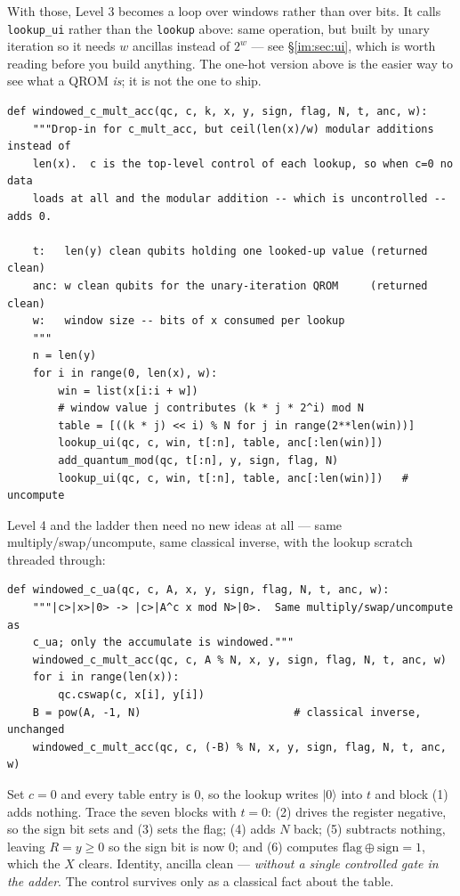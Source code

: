 \documentclass[11pt]{article}
\renewcommand{\ket}[1]{\lvert #1 \rangle}
\newcommand{\code}[1]{\texttt{#1}}
\theoremstyle{plain}
\theoremstyle{remark}
\begin{document}
\noindent
With those, Level 3 becomes a loop over windows rather than over bits. It calls \code{lookup\_ui} rather than the \code{lookup} above: same operation, but built by unary iteration so it needs $w$ ancillas instead of $2^w$ --- see \S\ref{im:sec:ui}, which is worth reading before you build anything. The one-hot version above is the easier way to see what a QROM \emph{is}; it is not the one to ship.

\begin{lstlisting}
def windowed_c_mult_acc(qc, c, k, x, y, sign, flag, N, t, anc, w):
    """Drop-in for c_mult_acc, but ceil(len(x)/w) modular additions instead of
    len(x).  c is the top-level control of each lookup, so when c=0 no data
    loads at all and the modular addition -- which is uncontrolled -- adds 0.

    t:   len(y) clean qubits holding one looked-up value (returned clean)
    anc: w clean qubits for the unary-iteration QROM     (returned clean)
    w:   window size -- bits of x consumed per lookup
    """
    n = len(y)
    for i in range(0, len(x), w):
        win = list(x[i:i + w])
        # window value j contributes (k * j * 2^i) mod N
        table = [((k * j) << i) % N for j in range(2**len(win))]
        lookup_ui(qc, c, win, t[:n], table, anc[:len(win)])
        add_quantum_mod(qc, t[:n], y, sign, flag, N)
        lookup_ui(qc, c, win, t[:n], table, anc[:len(win)])   # uncompute
\end{lstlisting}

\noindent
Level 4 and the ladder then need no new ideas at all --- same multiply/swap/uncompute, same
classical inverse, with the lookup scratch threaded through:

\begin{lstlisting}
def windowed_c_ua(qc, c, A, x, y, sign, flag, N, t, anc, w):
    """|c>|x>|0> -> |c>|A^c x mod N>|0>.  Same multiply/swap/uncompute as
    c_ua; only the accumulate is windowed."""
    windowed_c_mult_acc(qc, c, A % N, x, y, sign, flag, N, t, anc, w)
    for i in range(len(x)):
        qc.cswap(c, x[i], y[i])
    B = pow(A, -1, N)                        # classical inverse, unchanged
    windowed_c_mult_acc(qc, c, (-B) % N, x, y, sign, flag, N, t, anc, w)
\end{lstlisting}

\begin{keybox}[title={Why the $c=0$ entries being zero is the whole trick}]
Set $c=0$ and every table entry is $0$, so the lookup writes $\ket0$ into $t$ and block (1) adds
nothing. Trace the seven blocks with $t=0$: (2) drives the register negative, so the sign bit sets
and (3) sets the flag; (4) adds $N$ back; (5) subtracts nothing, leaving $R=y\ge0$ so the sign bit
is now $0$; and (6) computes $\text{flag}\oplus\text{sign}=1$, which the $X$ clears. Identity,
ancilla clean --- \emph{without a single controlled gate in the adder}. The control survives only
as a classical fact about the table.
\end{keybox}
\end{document}
